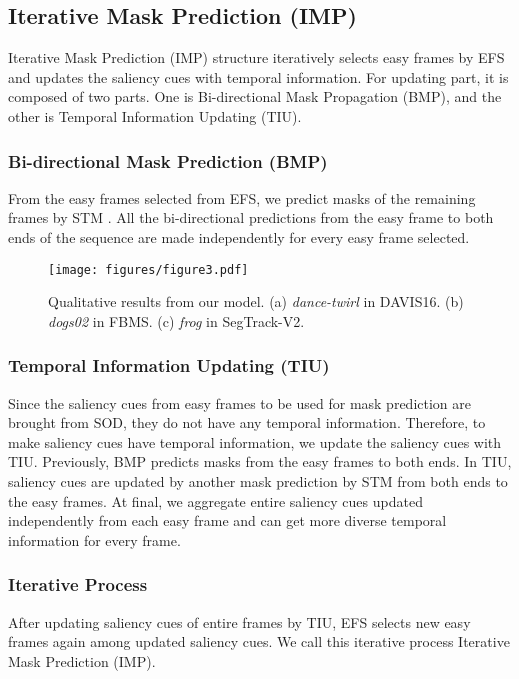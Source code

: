 \documentclass[letterpaper]{article} \usepackage{aaai22}  \usepackage{times}  \usepackage{helvet}  \usepackage{courier}  \usepackage[hyphens]{url}  \usepackage{graphicx} \urlstyle{rm} \def\UrlFont{\rm}  \usepackage{natbib}  \usepackage{caption} \DeclareCaptionStyle{ruled}{labelfont=normalfont,labelsep=colon,strut=off} \frenchspacing  \setlength{\pdfpagewidth}{8.5in}  \setlength{\pdfpageheight}{11in}  \usepackage{algorithm}
\begin{document}
\subsection{Iterative Mask Prediction (IMP)}

Iterative Mask Prediction (IMP) structure iteratively selects easy frames by EFS and updates the saliency cues with temporal information. For updating part, it is composed of two parts. One is Bi-directional Mask Propagation (BMP), and the other is Temporal Information Updating (TIU).

\subsubsection{Bi-directional Mask Prediction (BMP)}

From the easy frames selected from EFS, we predict masks of the remaining frames by STM \citep{oh2019video}. All the bi-directional predictions from the easy frame to both ends of the sequence are made independently for every easy frame selected. 

\begin{figure*}[t]
\texttt{[image: figures/figure3.pdf]}
\caption{Qualitative results from our model. (a) \textit{dance-twirl} in DAVIS16. (b) \textit{dogs02} in FBMS. (c) \textit{frog} in SegTrack-V2.}
\label{figure3}
\end{figure*}

\subsubsection{Temporal Information Updating (TIU)}

Since the saliency cues from easy frames to be used for mask prediction are brought from SOD, they do not have any temporal information. Therefore, to make saliency cues have temporal information, we update the saliency cues with TIU. Previously, BMP predicts masks from the easy frames to both ends. In TIU, saliency cues are updated by another mask prediction by STM  \citep{oh2019video} from both ends to the easy frames. At final, we aggregate entire saliency cues updated independently from each easy frame and can get more diverse temporal information for every frame. 

\subsubsection{Iterative Process}

After updating saliency cues of entire frames by TIU, EFS selects new easy frames again among updated saliency cues. We call this iterative process Iterative Mask Prediction (IMP).
\end{document}
